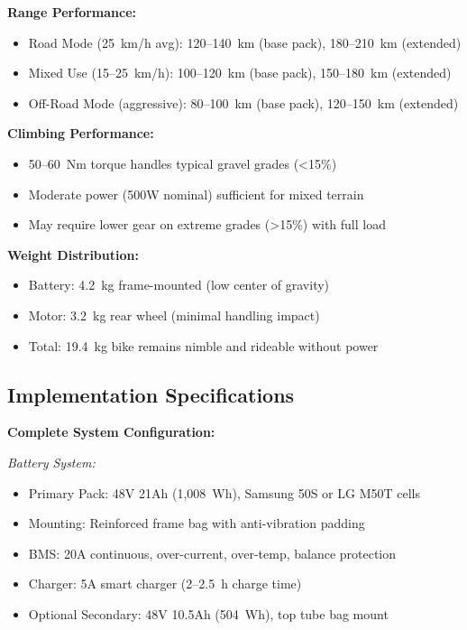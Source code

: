 \documentclass[12pt,a4paper]{article}
\begin{document}
\textbf{Range Performance:}
\begin{itemize}
    \item Road Mode (25~km/h avg): 120--140~km (base pack), 180--210~km (extended)
    \item Mixed Use (15--25~km/h): 100--120~km (base pack), 150--180~km (extended)
    \item Off-Road Mode (aggressive): 80--100~km (base pack), 120--150~km (extended)
\end{itemize}

\textbf{Climbing Performance:}
\begin{itemize}
    \item 50--60~Nm torque handles typical gravel grades (<15\%)
    \item Moderate power (500W nominal) sufficient for mixed terrain
    \item May require lower gear on extreme grades (>15\%) with full load
\end{itemize}

\textbf{Weight Distribution:}
\begin{itemize}
    \item Battery: 4.2~kg frame-mounted (low center of gravity)
    \item Motor: 3.2~kg rear wheel (minimal handling impact)
    \item Total: 19.4~kg bike remains nimble and rideable without power
\end{itemize}

\subsection{Implementation Specifications}

\textbf{Complete System Configuration:}

\textit{Battery System:}
\begin{itemize}
    \item Primary Pack: 48V 21Ah (1,008~Wh), Samsung 50S or LG M50T cells
    \item Mounting: Reinforced frame bag with anti-vibration padding
    \item BMS: 20A continuous, over-current, over-temp, balance protection
    \item Charger: 5A smart charger (2--2.5~h charge time)
    \item Optional Secondary: 48V 10.5Ah (504~Wh), top tube bag mount
\end{itemize}
\end{document}
